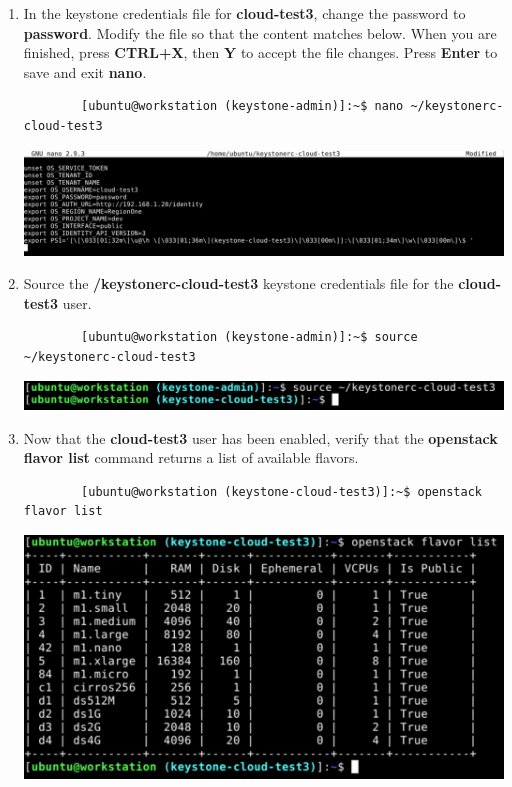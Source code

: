 \documentclass[letterpaper, 12pt]{article}
\begin{document}
\begin{enumerate}
    \item In the keystone credentials file for \textbf{cloud-test3}, change the password to \textbf{password}.
    Modify the file so that the content matches below.
    When you are finished, press \textbf{CTRL+X}, then \textbf{Y} to accept the file changes.
    Press \textbf{Enter} to save and exit \textbf{nano}.
    \begin{lstlisting}
        [ubuntu@workstation (keystone-admin)]:~$ nano ~/keystonerc-cloud-test3
    \end{lstlisting}

    \begin{center}
        \includegraphics[width=\linewidth]{images/part4/step19.png}
    \end{center}

    \item Source the \textbf{\texttildemid/keystonerc-cloud-test3} keystone credentials file for the
    \textbf{cloud-test3} user.
    \begin{lstlisting}
        [ubuntu@workstation (keystone-admin)]:~$ source ~/keystonerc-cloud-test3
    \end{lstlisting}

    \begin{center}
        \includegraphics[width=\linewidth]{images/part4/step20.png}
    \end{center}

    \item Now that the \textbf{cloud-test3} user has been enabled, verify that the \textbf{openstack flavor list} command returns a list of available flavors.
    \begin{lstlisting}
        [ubuntu@workstation (keystone-cloud-test3)]:~$ openstack flavor list
    \end{lstlisting}

    \begin{center}
        \includegraphics[width=\linewidth]{images/part4/step21.png}
    \end{center}


\end{enumerate}
\end{document}
